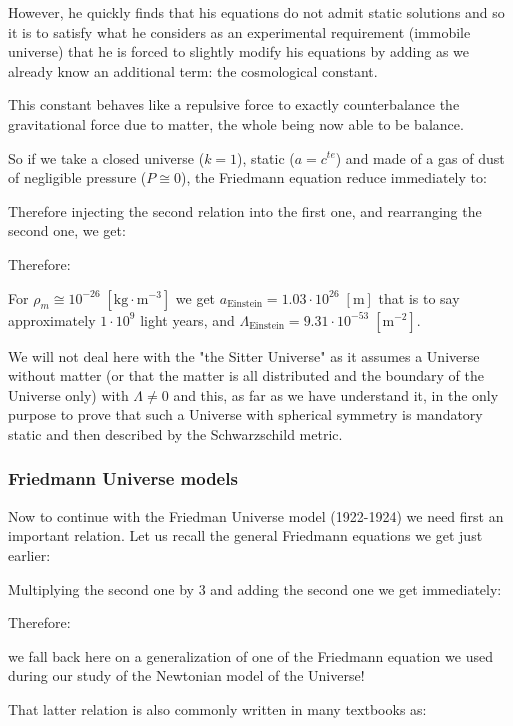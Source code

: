 	However, he quickly finds that his equations do not admit static solutions and so it is to satisfy what he considers as an experimental requirement (immobile universe) that he is forced to slightly modify his equations by adding as we already know an additional term: the cosmological constant.

	This constant behaves like a repulsive force to exactly counterbalance the gravitational force due to matter, the whole being now able to be balance.
	
	So if we take a closed universe ($k=1$), static ($a=c^{te}$) and made of a gas of dust of negligible pressure ($P\cong 0$), the Friedmann equation reduce immediately to:
	
	Therefore injecting the second relation into the first one, and rearranging the second one, we get:
	
	Therefore:
	
	For $\rho_m\cong 10^{-26}\;[\text{kg}\cdot\text{m}^{-3}]$ we get $a_\text{Einstein}=1.03\cdot 10^{26}\;[\text{m}]$ that is to say approximately $1\cdot 10^9$ light years, and $\Lambda_\text{Einstein}=9.31\cdot 10^{-53}\;[\text{m}^{-2}]$.
	\begin{tcolorbox}[title=Remark,colframe=black,arc=10pt]
	We will not deal here with the "the Sitter Universe" as it assumes a Universe without matter (or that the matter is all distributed and the boundary of the Universe only) with $\Lambda \neq 0$ and this, as far as we have understand it, in the only purpose to prove that such a Universe with spherical symmetry is mandatory static and then described by the Schwarzschild metric.
	\end{tcolorbox}
	
	\subsubsection{Friedmann Universe models}
	Now to continue with the Friedman Universe model (1922-1924) we need first an important relation. Let us recall the general Friedmann equations we get just earlier:
	
	Multiplying the second one by $3$ and adding the second one we get immediately:
	
	Therefore:
	
	we fall back here on a generalization of one of the Friedmann equation we used during our study of the Newtonian model of the Universe!
	
	That latter relation is also commonly written in many textbooks as:
	
